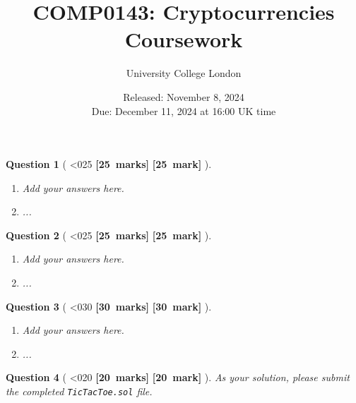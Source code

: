 \documentclass[a4paper]{article}
\theoremstyle{que}
\newtheorem{question}{Question}
\newcommand{\fixoffset}{\mbox{}\vspace*{-\bigskipamount}\vspace*{-\medskipamount}}
\newcommand\points[1]{%
\ifnum1<0#1\relax%
    {\bf \small [#1~marks]}%
  \else%
    {\bf \small [#1~mark]}%
  \fi%
}%
\newcommand{\module}{COMP0143: Cryptocurrencies}
\newcommand{\university}{University College London}
\newcommand{\assessment}{Coursework}
\newcommand{\releaseDate}{November 8, 2024}
\newcommand{\dueDate}{December 11, 2024 at 16:00 UK time}
\begin{document}
\title{\module\\[0.25cm]\assessment}
\author{\university}
\date{Released: \releaseDate\\[0.25cm]Due: \dueDate}
\maketitle

\newpage


\begin{question}[\points{25}]
  \fixoffset
  \begin{enumerate}[label=(\alph*)]
    \item Add your answers here.
    \item ...
  \end{enumerate}
\end{question}

\newpage


\begin{question}[\points{25}]
  \fixoffset
  \begin{enumerate}[label=(\alph*)]
    \item Add your answers here.
    \item ...
  \end{enumerate}
\end{question}

\newpage


\begin{question}[\points{30}]
  \fixoffset
  \begin{enumerate}[label=(\alph*)]
    \item Add your answers here.
    \item ...
  \end{enumerate}
\end{question}

\newpage


\begin{question}[\points{20}]
  As your solution, please submit the completed {\tt TicTacToe.sol} file.
\end{question}

\newpage
\end{document}
